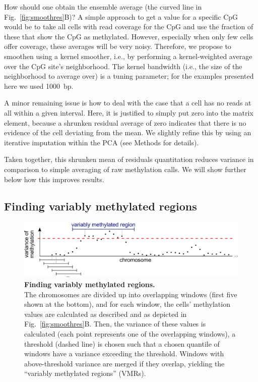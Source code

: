 \documentclass[twocolumn,10pt]{article}
\begin{document}
How should one obtain the ensemble average (the curved line in Fig.~\ref{fig:smoothres}B)?
A simple approach to get a value for a specific CpG would be to take all cells with read coverage for the CpG and use the fraction of these that show the CpG as methylated.
However, especially when only few cells offer coverage, these averages will be very noisy.
Therefore, we propose to smoothen using a kernel smoother, i.e., by performing a kernel-weighted average over the CpG site's neighborhood.
The kernel bandwidth (i.e., the size of the neighborhood to average over) is a tuning parameter; for the examples presented here we used 1000~bp.

A minor remaining issue is how to deal with the case that a cell has no reads at all within a given interval.
Here, it is justified to simply put zero into the matrix element, because a shrunken residual average of zero indicates that there is no evidence of the cell deviating from the mean.
We slightly refine this by using an iterative imputation within the PCA (see Methods for details).

Taken together, this shrunken mean of residuals quantitation reduces variance in comparison to simple averaging of raw methylation calls.
We will show further below how this improves results.

\subsection{Finding variably methylated regions}

\begin{figure}
    \begin{center}
    \includegraphics[width=\columnwidth]{figures/Fig_sliding.png}
    \end{center}
    \caption{\small \textbf{Finding variably methylated regions.}\\
    The chromosomes are divided up into overlapping windows (first five shown at the bottom), and for each window, the cells' methylation values are calculated as described and as depicted in Fig.~\ref{fig:smoothres}B.
    Then, the variance of these values is calculated (each point represents one of the overlapping windows), a threshold (dashed line) is chosen such that a chosen quantile of windows have a variance exceeding the threshold.
    Windows with above-threshold variance are merged if they overlap, yielding the ``variably methylated regions'' (VMRs).}
    \label{fig:vmr}
\end{figure}
\end{document}

